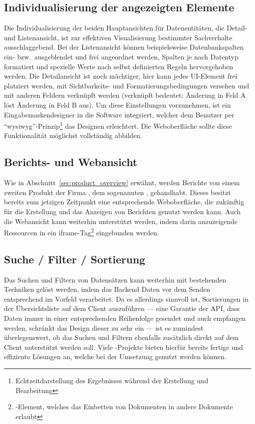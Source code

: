 \subsection{Individualisierung der angezeigten Elemente}\label{subsec:func_req_individualisation}
Die Individualisierung der beiden Hauptansichten für Datenentitäten, die Detail- und Listenansicht, ist zur effektiven Visualisierung bestimmter Sachverhalte ausschlaggebend. Bei der Listenansicht können beispielsweise Datenbankspalten ein- bzw.\ ausgeblendet und frei angeordnet werden, Spalten je nach Datentyp formatiert und spezielle Werte nach selbst definierten Regeln hervorgehoben werden. Die Detailansicht ist noch mächtiger, hier kann jedes UI-Element frei platziert werden, mit Sichtbarkeits- und Formatierungsbedingungen versehen und mit anderen Feldern verknüpft werden (verknüpft bedeutet: Änderung in Feld A löst Änderung in Feld B aus). Um diese Einstellungen vorzunehmen, ist ein Eingabemaskendesigner in die Software integriert, welcher dem Benutzer per \enquote{\gls{wysiwyg}}-Prinzip\footnote{Echtzeitdarstellung des Ergebnisses während der Erstellung und Bearbeitung} das Designen erleichtert.
Die Weboberfläche sollte diese Funktionalität möglichst vollständig abbilden.

\subsection{Berichts- und Webansicht}
Wie in Abschnitt~\ref{sec:product_overview} erwähnt, werden Berichte von einem zweiten Produkt der Firma , dem sogenannten , gehandhabt. Dieses besitzt bereits zum jetzigen Zeitpunkt eine entsprechende Weboberfläche, die zukünftig für die Erstellung und das Anzeigen von Berichten genutzt werden kann. 
Auch die Webansicht kann weiterhin unterstützt werden, indem darin anzuzeigende Ressourcen in ein iframe-Tag\footnote{-Element, welches das Einbetten von Dokumenten in andere Dokumente erlaubt} eingebunden werden.

\subsection{Suche / Filter / Sortierung}\label{subsec:func_req_search-filter-sorting}
Das Suchen und Filtern von Datensätzen kann weiterhin mit bestehenden Techniken gelöst werden, indem das Backend Daten vor dem Senden entsprechend im Vorfeld verarbeitet. Da es allerdings sinnvoll ist, Sortierungen in der Übersichtsliste auf dem Client auszuführen --- eine Garantie der API, dass Daten immer in einer entsprechenden Reihenfolge gesendet und auch empfangen werden, schränkt das Design dieser zu sehr ein --- ist es zumindest überlegenswert, ob das Suchen und Filtern ebenfalls zusätzlich direkt auf dem Client unterstützt werden soll. Viele -Projekte bieten hierfür bereits fertige und effiziente Lösungen an, welche bei der Umsetzung genutzt werden können.

